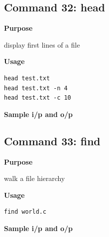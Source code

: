 \documentclass{article}
\begin{document}
\subsection{Command 32: head} 
\textbf{Purpose}
\begin{flushleft}
 display first lines of a file
\end{flushleft}
\textbf{Usage}
\begin{verbatim}
head test.txt
head test.txt -n 4
head test.txt -c 10
\end{verbatim}
\textbf{Sample i/p and o/p}
\begin{figure}[H] 
\end{figure}
\subsection{Command 33: find} 
\textbf{Purpose}
\begin{flushleft}
 walk a file hierarchy
\end{flushleft}
\textbf{Usage}
\begin{verbatim}
find world.c
\end{verbatim}
\textbf{Sample i/p and o/p}
\begin{figure}[H] 
\end{figure}
\end{document}
